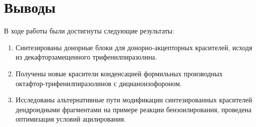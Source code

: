 \section{Выводы}
В ходе работы были достигнуты следующие результаты:
\begin{enumerate}
    \item Синтезированы донорные блоки для донорно-акцепторных красителей, исходя из декафторзамещенного трифенилпиразолина.
    \item Получены новые красители конденсацией формильных производных октафтор-трифенилпиразолинов с дицианоизофороном.
    \item Исследованы альтернативные пути модификации синтезированных красителей дендроидными фрагментами на примере реакции бензоилирования, проведена оптимизация условий ацилирования.
\end{enumerate}



